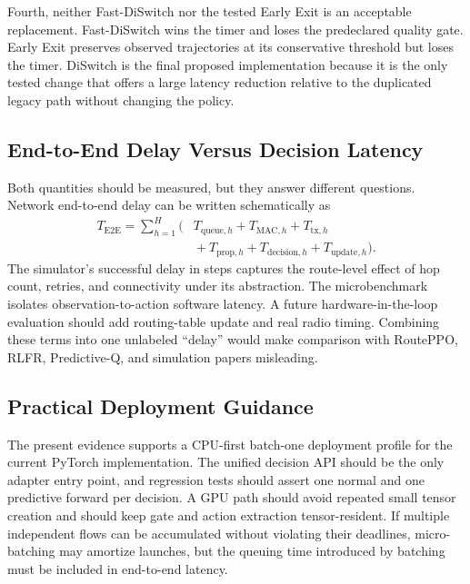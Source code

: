 \documentclass{ieeeaccess}
\newcommand{\DS}{DiSwitch}
\newcommand{\FastDS}{Fast-DiSwitch}
\begin{document}
Fourth, neither \FastDS{} nor the tested Early Exit is an acceptable replacement. \FastDS{} wins the timer and loses the predeclared quality gate. Early Exit preserves observed trajectories at its conservative threshold but loses the timer. \DS{} is the final proposed implementation because it is the only tested change that offers a large latency reduction relative to the duplicated legacy path without changing the policy.

\subsection{End-to-End Delay Versus Decision Latency}

Both quantities should be measured, but they answer different questions. Network end-to-end delay can be written schematically as
\begin{equation}
\begin{aligned}
T_{\mathrm{E2E}}=\sum_{h=1}^{H}\big(&T_{\mathrm{queue},h}+T_{\mathrm{MAC},h}
+T_{\mathrm{tx},h}\\
&{}+T_{\mathrm{prop},h}+T_{\mathrm{decision},h}
+T_{\mathrm{update},h}\big).
\end{aligned}
\end{equation}
The simulator's successful delay in steps captures the route-level effect of hop count, retries, and connectivity under its abstraction. The microbenchmark isolates observation-to-action software latency. A future hardware-in-the-loop evaluation should add routing-table update and real radio timing. Combining these terms into one unlabeled ``delay'' would make comparison with RoutePPO, RLFR, Predictive-Q, and simulation papers misleading.

\subsection{Practical Deployment Guidance}

The present evidence supports a CPU-first batch-one deployment profile for the current PyTorch implementation. The unified decision API should be the only adapter entry point, and regression tests should assert one normal and one predictive forward per decision. A GPU path should avoid repeated small tensor creation and should keep gate and action extraction tensor-resident. If multiple independent flows can be accumulated without violating their deadlines, micro-batching may amortize launches, but the queuing time introduced by batching must be included in end-to-end latency.
\end{document}
